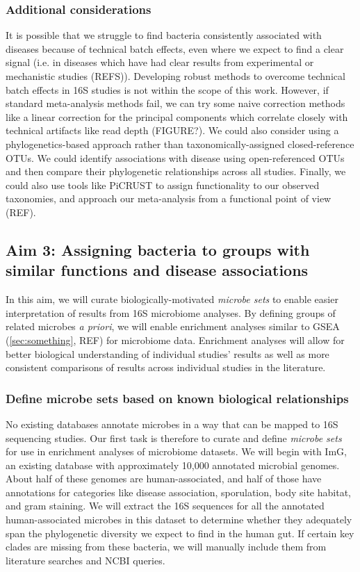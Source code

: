 \documentclass[12pt]{article}
\begin{document}
\subsubsection{Additional considerations}
It is possible that we struggle to find bacteria consistently associated with diseases because of technical batch effects, even where we expect to find a clear signal (i.e. in diseases which have had clear results from experimental or mechanistic studies (REFS)). Developing robust methods to overcome technical batch effects in 16S studies is not within the scope of this work. However, if standard meta-analysis methods fail, we can try some naive correction methods like a linear correction for the principal components which correlate closely with technical artifacts like read depth (FIGURE?). We could also consider using a phylogenetics-based approach rather than taxonomically-assigned closed-reference OTUs. We could identify associations with disease using open-referenced OTUs and then compare their phylogenetic relationships across all studies. Finally, we could also use tools like PiCRUST to assign functionality to our observed taxonomies, and approach our meta-analysis from a functional point of view (REF). 

\subsection{Aim 3: Assigning bacteria to groups with similar functions and disease associations}

In this aim, we will curate biologically-motivated \textit{microbe sets} to enable easier interpretation of results from 16S microbiome analyses. By defining groups of related microbes \textit{a priori}, we will enable enrichment analyses similar to GSEA (\ref{sec:something}, REF) for microbiome data. Enrichment analyses will allow for better biological understanding of individual studies' results as well as more consistent comparisons of results across individual studies in the literature.

\subsubsection{Define microbe sets based on known biological relationships}


No existing databases annotate microbes in a way that can be mapped to 16S sequencing studies. Our first task is therefore to curate and define \textit{microbe sets} for use in enrichment analyses of microbiome datasets. We will begin with ImG, an existing database with approximately 10,000 annotated microbial genomes. About half of these genomes are human-associated, and half of those have annotations for categories like disease association, sporulation, body site habitat, and gram staining. We will extract the 16S sequences for all the annotated human-associated microbes in this dataset to determine whether they adequately span the phylogenetic diversity we expect to find in the human gut. If certain key clades are missing from these bacteria, we will manually include them from literature searches and NCBI queries.
\end{document}
